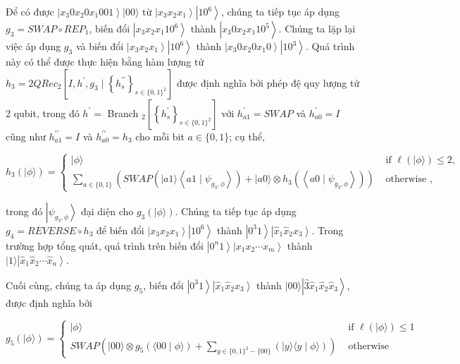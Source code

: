 \documentclass[10pt]{article}
\begin{document}
Để có được $\left|x_{3} 0 x_{2} 0 x_{1} 001\right\rangle|00\rangle$ từ $\left|x_{3} x_{2} x_{1}\right\rangle\left|10^{6}\right\rangle$, chúng ta tiếp tục áp dụng $g_{3}=S W A P \circ R E P_{1}$, biến đổi $\left|x_{3} x_{2} x_{1} 10^{6}\right\rangle$ thành $\left|x_{3} 0 x_{2} x_{1} 10^{5}\right\rangle$. Chúng ta lặp lại việc áp dụng $g_{3}$ và biến đổi $\left|x_{3} x_{2} x_{1}\right\rangle\left|10^{6}\right\rangle$ thành $\left|x_{3} 0 x_{2} 0 x_{1} 0\right\rangle\left|10^{3}\right\rangle$. Quá trình này có thể được thực hiện bằng hàm lượng tử $h_{3}=2 Q R e c_{2}\left[I, h^{\prime}, g_{3} \mid\left\{h_{s}^{\prime \prime}\right\}_{s \in\{0,1\}^{2}}\right]$ được định nghĩa bởi phép đệ quy lượng tử 2 qubit, trong đó $h^{\prime}=$ Branch $_{2}\left[\left\{h_{s}^{\prime}\right\}_{s \in\{0,1\}^{2}}\right]$ với $h_{a 1}^{\prime}=S W A P$ và $h_{a 0}^{\prime}=I$ cũng như $h_{a 1}^{\prime \prime}=I$ và $h_{a 0}^{\prime \prime}=h_{3}$ cho mỗi bit $a \in\{0,1\}$; cụ thể,

$$
h_{3}(|\phi\rangle)= \begin{cases}|\phi\rangle & \text { if } \ell(|\phi\rangle) \leq 2, \\ \sum_{a \in\{0,1\}}\left(S W A P\left(|a 1\rangle\left\langle a 1 \mid \psi_{g_{3}, \phi}\right\rangle\right)+|a 0\rangle \otimes h_{3}\left(\left\langle a 0 \mid \psi_{g_{3}, \phi}\right\rangle\right)\right) & \text { otherwise },\end{cases}
$$

trong đó $\left|\psi_{g_{3}, \phi}\right\rangle$ đại diện cho $g_{3}(|\phi\rangle)$. Chúng ta tiếp tục áp dụng $g_{4}=R E V E R S E \circ h_{3}$ để biến đổi $\left|x_{3} x_{2} x_{1}\right\rangle\left|10^{6}\right\rangle$ thành $\left|0^{3} 1\right\rangle\left|\hat{x}_{1} \hat{x}_{2} \hat{x}_{3}\right\rangle$. Trong trường hợp tổng quát, quá trình trên biến đổi $\left|0^{n} 1\right\rangle\left|x_{1} x_{2} \cdots x_{m}\right\rangle$ thành $|1\rangle\left|\hat{x}_{1} \hat{x}_{2} \cdots \hat{x}_{n}\right\rangle$.

Cuối cùng, chúng ta áp dụng $g_{5}$, biến đổi $\left|0^{3} 1\right\rangle\left|\hat{x}_{1} \hat{x}_{2} \hat{x}_{3}\right\rangle$ thành $|00\rangle\left|\hat{3} \hat{x}_{1} \hat{x}_{2} \hat{x}_{3}\right\rangle$, được định nghĩa bởi

$$
g_{5}(|\phi\rangle)= \begin{cases}|\phi\rangle & \text { if } \ell(|\phi\rangle) \leq 1 \\ S W A P\left(|00\rangle \otimes g_{5}(\langle 00 \mid \phi\rangle)+\sum_{y \in\{0,1\}^{2}-\{00\}}(|y\rangle\langle y \mid \phi\rangle)\right) & \text { otherwise }\end{cases}
$$
\end{document}
